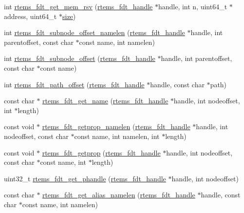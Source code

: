 \begin{DoxyCompactItemize}
int \mbox{\hyperlink{rtems-fdt_8h_af1bed3b15e9467073b96de9eb48b0f58}{rtems\+\_\+fdt\+\_\+get\+\_\+mem\+\_\+rsv}} (\mbox{\hyperlink{structrtems__fdt__handle}{rtems\+\_\+fdt\+\_\+handle}} $\ast$handle, int n, uint64\+\_\+t $\ast$address, uint64\+\_\+t $\ast$\mbox{\hyperlink{sun4u_2tte_8h_a245260f6f74972558f61b85227df5aae}{size}})
\item 
int \mbox{\hyperlink{rtems-fdt_8h_a46722743c63e5a5ccaec9769296112a2}{rtems\+\_\+fdt\+\_\+subnode\+\_\+offset\+\_\+namelen}} (\mbox{\hyperlink{structrtems__fdt__handle}{rtems\+\_\+fdt\+\_\+handle}} $\ast$handle, int parentoffset, const char $\ast$const name, int namelen)
\item 
int \mbox{\hyperlink{rtems-fdt_8h_a85e2da108a4d349e480859964ad66b87}{rtems\+\_\+fdt\+\_\+subnode\+\_\+offset}} (\mbox{\hyperlink{structrtems__fdt__handle}{rtems\+\_\+fdt\+\_\+handle}} $\ast$handle, int parentoffset, const char $\ast$const name)
\item 
int \mbox{\hyperlink{rtems-fdt_8h_a57007eed312123059461eb8bbace1c09}{rtems\+\_\+fdt\+\_\+path\+\_\+offset}} (\mbox{\hyperlink{structrtems__fdt__handle}{rtems\+\_\+fdt\+\_\+handle}} $\ast$handle, const char $\ast$path)
\item 
const char $\ast$ \mbox{\hyperlink{rtems-fdt_8h_a231745529cbd5da1e22005e6c2168bc5}{rtems\+\_\+fdt\+\_\+get\+\_\+name}} (\mbox{\hyperlink{structrtems__fdt__handle}{rtems\+\_\+fdt\+\_\+handle}} $\ast$handle, int nodeoffset, int $\ast$length)
\item 
const void $\ast$ \mbox{\hyperlink{rtems-fdt_8h_ac2898a55d17e55765179f2d4b1acebcf}{rtems\+\_\+fdt\+\_\+getprop\+\_\+namelen}} (\mbox{\hyperlink{structrtems__fdt__handle}{rtems\+\_\+fdt\+\_\+handle}} $\ast$handle, int nodeoffset, const char $\ast$const name, int namelen, int $\ast$length)
\item 
const void $\ast$ \mbox{\hyperlink{rtems-fdt_8h_aaf20b3498dc0cce9c497c0adacb77955}{rtems\+\_\+fdt\+\_\+getprop}} (\mbox{\hyperlink{structrtems__fdt__handle}{rtems\+\_\+fdt\+\_\+handle}} $\ast$handle, int nodeoffset, const char $\ast$const name, int $\ast$length)
\item 
uint32\+\_\+t \mbox{\hyperlink{rtems-fdt_8h_a380df921ada4d6d9b5e1c1605448744a}{rtems\+\_\+fdt\+\_\+get\+\_\+phandle}} (\mbox{\hyperlink{structrtems__fdt__handle}{rtems\+\_\+fdt\+\_\+handle}} $\ast$handle, int nodeoffset)
\item 
const char $\ast$ \mbox{\hyperlink{rtems-fdt_8h_a424bf49f7d9b45ac4340206aef66c8f4}{rtems\+\_\+fdt\+\_\+get\+\_\+alias\+\_\+namelen}} (\mbox{\hyperlink{structrtems__fdt__handle}{rtems\+\_\+fdt\+\_\+handle}} $\ast$handle, const char $\ast$const name, int namelen)

\end{DoxyCompactItemize}
